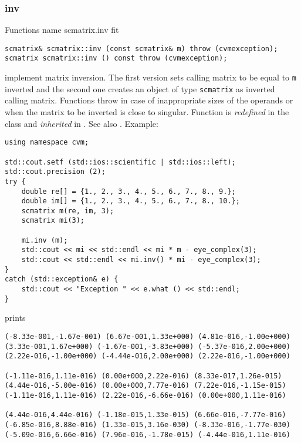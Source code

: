 \subsubsection{inv}
Functions%
\pdfdest name {scmatrix.inv} fit
\begin{verbatim}
scmatrix& scmatrix::inv (const scmatrix& m) throw (cvmexception);
scmatrix scmatrix::inv () const throw (cvmexception);
\end{verbatim}
implement matrix inversion.
The first version sets  calling matrix to be equal to 
\verb"m" inverted and the second one
creates an object of type \verb"scmatrix" as inverted calling matrix.
Functions throw   
in case of inappropriate
sizes of the operands or when the matrix to be inverted is close to
singular.
Function is \emph{redefined} in the class
and \emph{inherited} in .
See also
.
Example:
\begin{Verbatim}
using namespace cvm;

std::cout.setf (std::ios::scientific | std::ios::left); 
std::cout.precision (2);
try {
    double re[] = {1., 2., 3., 4., 5., 6., 7., 8., 9.};
    double im[] = {1., 2., 3., 4., 5., 6., 7., 8., 10.};
    scmatrix m(re, im, 3);
    scmatrix mi(3);

    mi.inv (m);
    std::cout << mi << std::endl << mi * m - eye_complex(3);
    std::cout << std::endl << mi.inv() * mi - eye_complex(3);
}
catch (std::exception& e) {
    std::cout << "Exception " << e.what () << std::endl;
}
\end{Verbatim}
prints
\begin{Verbatim}
(-8.33e-001,-1.67e-001) (6.67e-001,1.33e+000) (4.81e-016,-1.00e+000)
(3.33e-001,1.67e+000) (-1.67e-001,-3.83e+000) (-5.37e-016,2.00e+000)
(2.22e-016,-1.00e+000) (-4.44e-016,2.00e+000) (2.22e-016,-1.00e+000)

(-1.11e-016,1.11e-016) (0.00e+000,2.22e-016) (8.33e-017,1.26e-015)
(4.44e-016,-5.00e-016) (0.00e+000,7.77e-016) (7.22e-016,-1.15e-015)
(-1.11e-016,1.11e-016) (2.22e-016,-6.66e-016) (0.00e+000,1.11e-016)

(4.44e-016,4.44e-016) (-1.18e-015,1.33e-015) (6.66e-016,-7.77e-016)
(-6.85e-016,8.88e-016) (1.33e-015,3.16e-030) (-8.33e-016,-1.77e-030)
(-5.09e-016,6.66e-016) (7.96e-016,-1.78e-015) (-4.44e-016,1.11e-016)
\end{Verbatim}
\newpage




